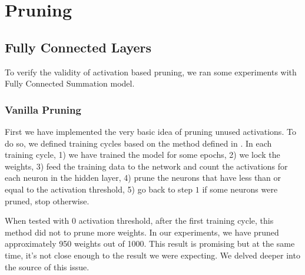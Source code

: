 \iffalse
Results

    The results are actual statements of observations, including statistics, tables and graphs.
    Indicate information on range of variation.
    Mention negative results as well as positive. Do not interpret results - save that for the discussion. 
    Lay out the case as for a jury. Present sufficient details so that others can draw their own inferences and construct their own explanations. 
    Use S.I. units (m, s, kg, W, etc.) throughout the thesis. 
    Break up your results into logical segments by using subheadings
    Key results should be stated in clear sentences at the beginning of paragraphs.  It is far better to say "X had significant positive relationship with Y (linear regression p<0.01, r^2=0.79)" then to start with a less informative like "There is a significant relationship between X and Y".  Describe the nature of the findings; do not just tell the reader whether or not they are significant.  
\fi
\section{Pruning}
\subsection{Fully Connected Layers}
To verify the validity of activation based pruning, we ran some experiments with Fully Connected Summation model. 
\subsubsection{Vanilla Pruning}
First we have implemented the very basic idea of pruning unused activations. To do so, we defined training cycles based on the method defined in \cite{Hu:2016aa}. In each training cycle, 1) we have trained the model for some epochs, 2) we lock the weights, 3) feed the training data to the network and count the activations for each neuron in the hidden layer, 4) prune the neurons that have less than or equal to the activation threshold, 5) go back to step $1$ if some neurons were pruned, stop otherwise.

When tested with $0$ activation threshold, after the first training cycle, this method did not to prune more weights. In our experiments, we have pruned approximately 950 weights out of 1000. This result is promising but at the same time, it's not close enough to the result we were expecting. We delved deeper into the source of this issue.

